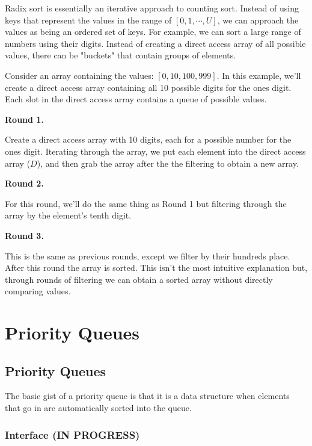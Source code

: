 \documentclass[11pt,a4paper,english]{report}
\begin{document}
Radix sort is essentially an iterative approach to counting sort. Instead of using keys that represent the values in the range of $[0, 1, \dotsb, U]$, we can approach the values as being an ordered set of keys. For example, we can sort a large range of numbers using their digits. Instead of creating a direct access array of all possible values, there can be "buckets" that contain groups of elements.


\bigskip
\noindent Consider an array containing the values: $[0, 10, 100, 999]$. In this example, we'll create a direct access array containing all 10 possible digits for the ones digit. Each slot in the direct access array contains a queue of possible values. 

\bigskip \noindent \textbf{Round 1.} 

\noindent Create a direct access array with 10 digits, each for a possible number for the ones digit. Iterating through the array, we put each element into the direct access array ($D$), and then grab the array after the the filtering to obtain a new array.

\bigskip
\noindent \textbf{Round 2.}

\noindent For this round, we'll do the same thing as Round 1 but filtering through the array by the element's tenth digit.

\bigskip

\noindent \textbf{Round 3.} 

\noindent This is the same as previous rounds, except we filter by their hundreds place. After this round the array is sorted. This isn't the most intuitive explanation but, through rounds of filtering we can obtain a sorted array without directly comparing values.

\chapter{Priority Queues}

\section{Priority Queues}

The basic gist of a priority queue is that it is a data structure when elements that go in are automatically sorted into the queue.

\subsection{Interface (IN PROGRESS)}
\end{document}
